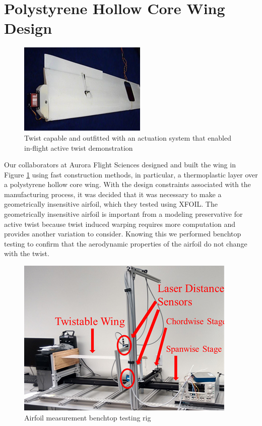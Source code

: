 \documentclass[11pt]{ucthesis}
\begin{document}
\section{Polystyrene Hollow Core Wing Design}

\begin{figure}[thpb]
\centering
\includegraphics[width=0.5\linewidth]{Figures/AuroraWing.png}
\caption{Twist capable and outfitted with an actuation system that enabled in-flight active twist demonstration}
\label{fig:Awing}
\end{figure}

Our collaborators at Aurora Flight Sciences designed and built the wing in Figure \ref{fig:Awing} using fast construction methods, in particular, a thermoplastic layer over a polystyrene hollow core wing. With the design constraints associated with the manufacturing process, it was decided that it was necessary to make a geometrically insensitive airfoil, which they tested using XFOIL. The geometrically insensitive airfoil is important from a modeling preservative for active twist because twist induced warping requires more computation and provides another variation to consider. Knowing this we performed benchtop testing to confirm that the aerodynamic properties of the airfoil do not change with the twist.

\begin{figure}[thpb]
\centering
\includegraphics[width=0.55\linewidth]{Figures/AuroraWingBenchtopTest.png}
\caption{Airfoil measurement benchtop testing rig}
\label{fig:Atestrig}
\end{figure}
\end{document}
